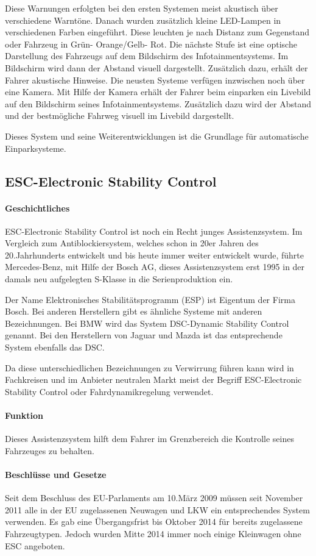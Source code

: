 Diese Warnungen erfolgten bei den ersten Systemen meist akustisch über verschiedene Warntöne. Danach wurden zusätzlich kleine LED-Lampen in verschiedenen Farben eingeführt. Diese leuchten je nach Distanz zum Gegenstand oder Fahrzeug in Grün- Orange/Gelb- Rot. Die nächste Stufe ist eine optische Darstellung des Fahrzeugs auf dem Bildschirm des Infotainmentsystems. Im Bildschirm wird dann der Abstand visuell dargestellt. Zusätzlich dazu, erhält der Fahrer akustische Hinweise. Die neusten Systeme verfügen inzwischen noch über eine Kamera. Mit Hilfe der Kamera erhält der Fahrer beim einparken ein Livebild auf den Bildschirm seines Infotainmentsystems. Zusätzlich dazu wird der Abstand und der bestmögliche Fahrweg visuell im Livebild dargestellt.

Dieses System und seine Weiterentwicklungen ist die Grundlage für automatische Einparksysteme. 
\subsection{ESC-Electronic Stability Control} 
\paragraph{Geschichtliches} ESC-Electronic Stability Control ist noch ein Recht junges Assistenzsystem. Im Vergleich zum Antiblockiersystem, welches schon in 20er Jahren des 20.Jahrhunderts entwickelt und bis heute immer weiter entwickelt wurde, führte Mercedes-Benz, mit Hilfe der Bosch AG, dieses Assistenzsystem erst 1995 in der damals neu aufgelegten S-Klasse in die Serienproduktion ein. 

Der Name Elektronisches Stabilitätsprogramm (ESP) ist Eigentum der Firma Bosch. Bei anderen Herstellern gibt es ähnliche Systeme mit anderen Bezeichnungen. Bei BMW wird das System DSC-Dynamic Stability Control genannt. Bei den Herstellern von Jaguar und Mazda ist das entsprechende System ebenfalls das DSC.

Da diese unterschiedlichen Bezeichnungen zu Verwirrung führen kann wird in Fachkreisen und im Anbieter neutralen Markt meist der Begriff ESC-Electronic Stability Control oder Fahrdynamikregelung verwendet. 
\paragraph{Funktion}Dieses Assistenzsystem hilft dem Fahrer im Grenzbereich die Kontrolle seines Fahrzeuges zu behalten. 

\paragraph{Beschlüsse und Gesetze} Seit dem Beschluss des EU-Parlaments am 10.März 2009 müssen seit November 2011 alle in der EU zugelassenen Neuwagen und LKW ein entsprechendes System verwenden. Es gab eine Übergangsfrist bis Oktober 2014 für bereits zugelassene Fahrzeugtypen. Jedoch wurden Mitte 2014 immer noch einige Kleinwagen ohne ESC angeboten. 


